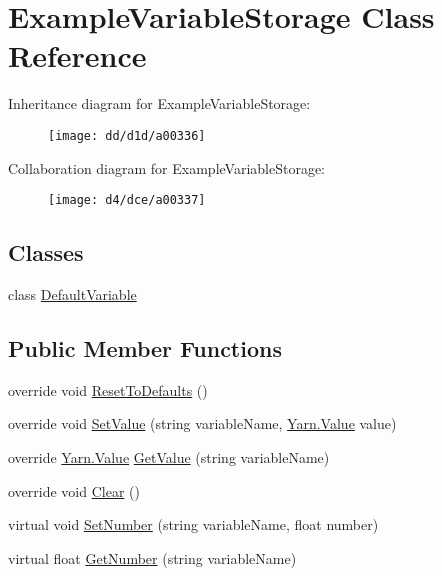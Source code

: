 \hypertarget{a00069}{\section{Example\-Variable\-Storage Class Reference}
\label{a00069}
}


Inheritance diagram for Example\-Variable\-Storage\-:
\nopagebreak
\begin{figure}[H]
\begin{center}
\leavevmode
\texttt{[image: dd/d1d/a00336]}
\end{center}
\end{figure}


Collaboration diagram for Example\-Variable\-Storage\-:
\nopagebreak
\begin{figure}[H]
\begin{center}
\leavevmode
\texttt{[image: d4/dce/a00337]}
\end{center}
\end{figure}
\subsection*{Classes}
\begin{DoxyCompactItemize}
\item 
class \hyperlink{a00069_da/de0/a00317}{Default\-Variable}
\end{DoxyCompactItemize}
\subsection*{Public Member Functions}
\begin{DoxyCompactItemize}
\item 
override void \hyperlink{a00069_a3a05d66cdacadb2e9b618cd0aef45f84}{Reset\-To\-Defaults} ()
\item 
override void \hyperlink{a00069_ac4265c1c9da485f13a6b05784b0f668d}{Set\-Value} (string variable\-Name, \hyperlink{a00163}{Yarn.\-Value} value)
\item 
override \hyperlink{a00163}{Yarn.\-Value} \hyperlink{a00069_a741593be1a299dcc2136f05b9b4a995a}{Get\-Value} (string variable\-Name)
\item 
override void \hyperlink{a00069_a0ce614bee8d5b220500fb765390b4ca3}{Clear} ()
\item 
virtual void \hyperlink{a00167_ac0d2f2e081944ad197992a26ad1a833c}{Set\-Number} (string variable\-Name, float number)
\item 
virtual float \hyperlink{a00167_add85a45dd65a5d4bd41c9d5ce5f77d19}{Get\-Number} (string variable\-Name)
\end{DoxyCompactItemize}
